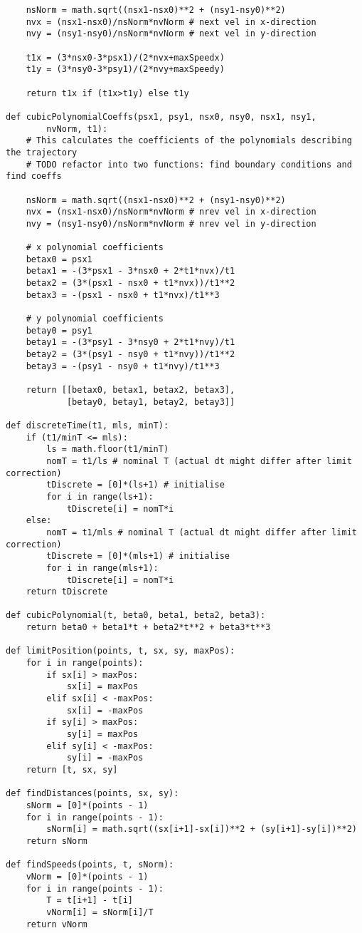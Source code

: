 \begin{verbatim}
    nsNorm = math.sqrt((nsx1-nsx0)**2 + (nsy1-nsy0)**2)
    nvx = (nsx1-nsx0)/nsNorm*nvNorm # next vel in x-direction
    nvy = (nsy1-nsy0)/nsNorm*nvNorm # next vel in y-direction

    t1x = (3*nsx0-3*psx1)/(2*nvx+maxSpeedx)
    t1y = (3*nsy0-3*psy1)/(2*nvy+maxSpeedy)

    return t1x if (t1x>t1y) else t1y

def cubicPolynomialCoeffs(psx1, psy1, nsx0, nsy0, nsx1, nsy1,
        nvNorm, t1):
    # This calculates the coefficients of the polynomials describing the trajectory
    # TODO refactor into two functions: find boundary conditions and find coeffs

    nsNorm = math.sqrt((nsx1-nsx0)**2 + (nsy1-nsy0)**2)
    nvx = (nsx1-nsx0)/nsNorm*nvNorm # nrev vel in x-direction
    nvy = (nsy1-nsy0)/nsNorm*nvNorm # nrev vel in y-direction

    # x polynomial coefficients
    betax0 = psx1
    betax1 = -(3*psx1 - 3*nsx0 + 2*t1*nvx)/t1
    betax2 = (3*(psx1 - nsx0 + t1*nvx))/t1**2
    betax3 = -(psx1 - nsx0 + t1*nvx)/t1**3

    # y polynomial coefficients
    betay0 = psy1
    betay1 = -(3*psy1 - 3*nsy0 + 2*t1*nvy)/t1
    betay2 = (3*(psy1 - nsy0 + t1*nvy))/t1**2
    betay3 = -(psy1 - nsy0 + t1*nvy)/t1**3

    return [[betax0, betax1, betax2, betax3],
            [betay0, betay1, betay2, betay3]]

def discreteTime(t1, mls, minT):
    if (t1/minT <= mls):
        ls = math.floor(t1/minT)
        nomT = t1/ls # nominal T (actual dt might differ after limit correction)
        tDiscrete = [0]*(ls+1) # initialise
        for i in range(ls+1):
            tDiscrete[i] = nomT*i
    else:
        nomT = t1/mls # nominal T (actual dt might differ after limit correction)
        tDiscrete = [0]*(mls+1) # initialise
        for i in range(mls+1):
            tDiscrete[i] = nomT*i
    return tDiscrete

def cubicPolynomial(t, beta0, beta1, beta2, beta3):
    return beta0 + beta1*t + beta2*t**2 + beta3*t**3

def limitPosition(points, t, sx, sy, maxPos):
    for i in range(points):
        if sx[i] > maxPos:
            sx[i] = maxPos
        elif sx[i] < -maxPos:
            sx[i] = -maxPos
        if sy[i] > maxPos:
            sy[i] = maxPos
        elif sy[i] < -maxPos:
            sy[i] = -maxPos
    return [t, sx, sy]

def findDistances(points, sx, sy):
    sNorm = [0]*(points - 1)
    for i in range(points - 1):
        sNorm[i] = math.sqrt((sx[i+1]-sx[i])**2 + (sy[i+1]-sy[i])**2)
    return sNorm

def findSpeeds(points, t, sNorm):
    vNorm = [0]*(points - 1)
    for i in range(points - 1):
        T = t[i+1] - t[i]
        vNorm[i] = sNorm[i]/T
    return vNorm
\end{verbatim}